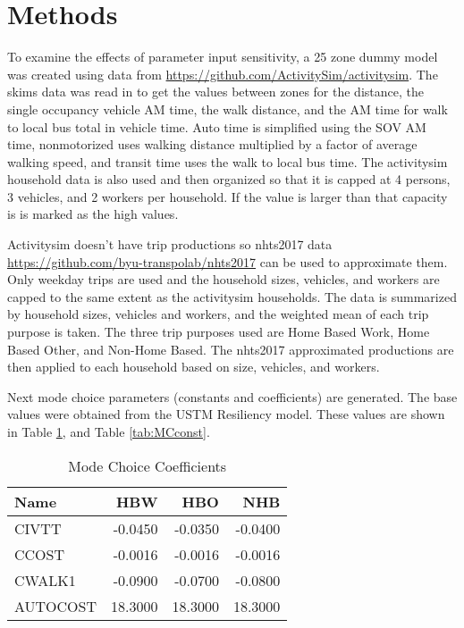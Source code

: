 \documentclass[3p, authoryear, review]{elsarticle} %
\begin{document}
\hypertarget{methods}{%
\section{Methods}\label{methods}}

To examine the effects of parameter input sensitivity, a 25 zone dummy model was created using data from \url{https://github.com/ActivitySim/activitysim}. The skims data was read in to get the values between zones for the distance, the single occupancy vehicle AM time, the walk distance, and the AM time for walk to local bus total in vehicle time. Auto time is simplified using the SOV AM time, nonmotorized uses walking distance multiplied by a factor of average walking speed, and transit time uses the walk to local bus time. The activitysim household data is also used and then organized so that it is capped at 4 persons, 3 vehicles, and 2 workers per household. If the value is larger than that capacity is is marked as the high values.

Activitysim doesn't have trip productions so nhts2017 data \url{https://github.com/byu-transpolab/nhts2017} can be used to approximate them. Only weekday trips are used and the household sizes, vehicles, and workers are capped to the same extent as the activitysim households. The data is summarized by household sizes, vehicles and workers, and the weighted mean of each trip purpose is taken. The three trip purposes used are Home Based Work, Home Based Other, and Non-Home Based. The nhts2017 approximated productions are then applied to each household based on size, vehicles, and workers.

Next mode choice parameters (constants and coefficients) are generated. The base values were obtained from the USTM Resiliency model. These values are shown in Table \ref{tab:MCcoeff}, and Table \ref{tab:MCconst}.

\begin{table}

\caption{\label{tab:MCcoeff}Mode Choice Coefficients}
\centering
\begin{tabular}[t]{l|r|r|r}
\hline
Name & HBW & HBO & NHB\\
\hline
CIVTT & -0.0450 & -0.0350 & -0.0400\\
\hline
CCOST & -0.0016 & -0.0016 & -0.0016\\
\hline
CWALK1 & -0.0900 & -0.0700 & -0.0800\\
\hline
AUTOCOST & 18.3000 & 18.3000 & 18.3000\\
\hline
\end{tabular}
\end{table}
\end{document}
